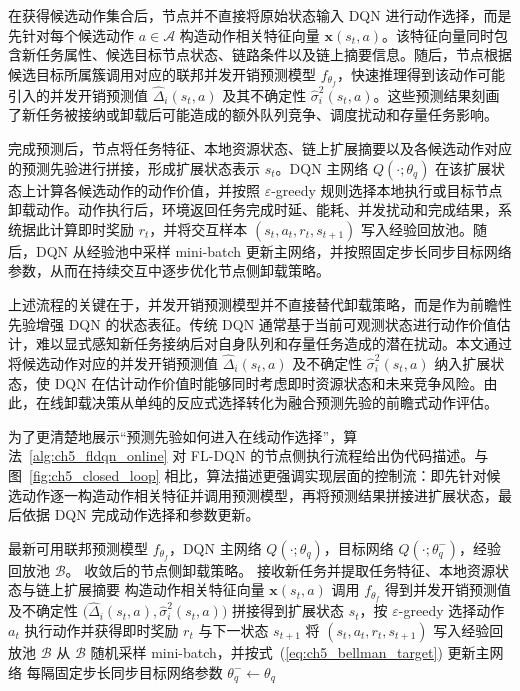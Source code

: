 在获得候选动作集合后，节点并不直接将原始状态输入 DQN 进行动作选择，而是先针对每个候选动作 $a\in\mathcal{A}$ 构造动作相关特征向量 $\bm{x}(s_t,a)$。该特征向量同时包含新任务属性、候选目标节点状态、链路条件以及链上摘要信息。随后，节点根据候选目标所属簇调用对应的联邦并发开销预测模型 $f_{\theta_f}$，快速推理得到该动作可能引入的并发开销预测值 $\widehat{\Delta}_i(s_t,a)$ 及其不确定性 $\widehat{\sigma}_i^2(s_t,a)$。这些预测结果刻画了新任务被接纳或卸载后可能造成的额外队列竞争、调度扰动和存量任务影响。

完成预测后，节点将任务特征、本地资源状态、链上扩展摘要以及各候选动作对应的预测先验进行拼接，形成扩展状态表示 $s_t$。DQN 主网络 $Q(\cdot;\theta_q)$ 在该扩展状态上计算各候选动作的动作价值，并按照 $\varepsilon$-greedy 规则选择本地执行或目标节点卸载动作。动作执行后，环境返回任务完成时延、能耗、并发扰动和完成结果，系统据此计算即时奖励 $r_t$，并将交互样本 $(s_t,a_t,r_t,s_{t+1})$ 写入经验回放池。随后，DQN 从经验池中采样 mini-batch 更新主网络，并按照固定步长同步目标网络参数，从而在持续交互中逐步优化节点侧卸载策略。

上述流程的关键在于，并发开销预测模型并不直接替代卸载策略，而是作为前瞻性先验增强 DQN 的状态表征。传统 DQN 通常基于当前可观测状态进行动作价值估计，难以显式感知新任务接纳后对自身队列和存量任务造成的潜在扰动。本文通过将候选动作对应的并发开销预测值 $\widehat{\Delta}_i(s_t,a)$ 及不确定性 $\widehat{\sigma}_i^2(s_t,a)$ 纳入扩展状态，使 DQN 在估计动作价值时能够同时考虑即时资源状态和未来竞争风险。由此，在线卸载决策从单纯的反应式选择转化为融合预测先验的前瞻式动作评估。

为了更清楚地展示“预测先验如何进入在线动作选择”，算法~\ref{alg:ch5_fldqn_online} 对 FL-DQN 的节点侧执行流程给出伪代码描述。与图~\ref{fig:ch5_closed_loop} 相比，算法描述更强调实现层面的控制流：即先针对候选动作逐一构造动作相关特征并调用预测模型，再将预测结果拼接进扩展状态，最后依据 DQN 完成动作选择和参数更新。

\begin{algorithm}[H]
    \caption{FL-DQN 在线任务卸载决策流程}
    \label{alg:ch5_fldqn_online}
    \small
    \begin{algorithmic}[1]
        最新可用联邦预测模型 $f_{\theta_f}$，DQN 主网络 $Q(\cdot;\theta_q)$，目标网络 $Q(\cdot;\theta_q^-)$，经验回放池 $\mathcal{B}$。
        收敛后的节点侧卸载策略。
        \State 接收新任务并提取任务特征、本地资源状态与链上扩展摘要
        \State 构造动作相关特征向量 $\bm{x}(s_t,a)$
        \State 调用 $f_{\theta_f}$ 得到并发开销预测值及不确定性 $\bigl(\widehat{\Delta}_i(s_t,a),\widehat{\sigma}_i^2(s_t,a)\bigr)$
        \EndFor
        \State 拼接得到扩展状态 $s_t$，按 $\varepsilon$-greedy 选择动作 $a_t$
        \State 执行动作并获得即时奖励 $r_t$ 与下一状态 $s_{t+1}$
        \State 将 $(s_t,a_t,r_t,s_{t+1})$ 写入经验回放池 $\mathcal{B}$
        \State 从 $\mathcal{B}$ 随机采样 mini-batch，并按式~(\ref{eq:ch5_bellman_target}) 更新主网络
        \State 每隔固定步长同步目标网络参数 $\theta_q^- \leftarrow \theta_q$
        \EndIf
        \EndFor
    \end{algorithmic}
\end{algorithm}

